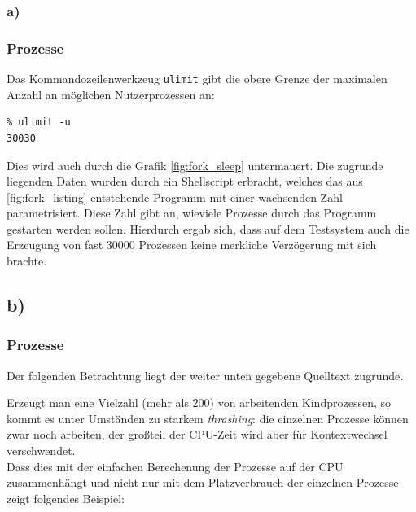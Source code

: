 \documentclass[a4paper,
12pt,
BCOR12mm,
]{scrartcl}
\begin{document}
\subsubsection{a)}
\subsubsection{Prozesse}
Das Kommandozeilenwerkzeug \verb|ulimit| gibt die obere Grenze der maximalen Anzahl an
möglichen Nutzerprozessen an:
\begin{verbatim}
% ulimit -u
30030
\end{verbatim}
Dies wird auch durch die Grafik \ref{fig:fork_sleep} untermauert. Die zugrunde liegenden
Daten wurden durch ein Shellscript erbracht, welches das aus \ref{fig:fork_listing}
entstehende Programm mit einer wachsenden Zahl parametrisiert. Diese Zahl gibt an,
wieviele Prozesse durch das Programm gestarten werden sollen. Hierdurch ergab sich, dass
auf dem Testsystem auch die Erzeugung von fast $30000$ Prozessen keine merkliche
Verzögerung mit sich brachte.
\subsection{b)}
\subsubsection{Prozesse}
Der folgenden Betrachtung liegt der weiter unten gegebene Quelltext zugrunde.
\begin{figure}[h!]
	\begin{center}
	\end{center}
\end{figure}
Erzeugt man eine Vielzahl (mehr als 200) von arbeitenden Kindprozessen, so kommt es unter Umständen zu
starkem \emph{thrashing}: die einzelnen Prozesse können zwar noch arbeiten, der großteil
der CPU-Zeit wird aber für Kontextwechsel verschwendet.\\
Dass dies mit der einfachen Berechenung der Prozesse auf der CPU zusammenhängt und nicht
nur mit dem Platzverbrauch der einzelnen Prozesse zeigt folgendes Beispiel:
\end{document}

